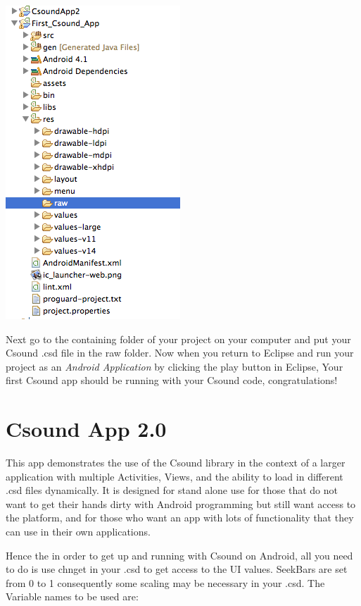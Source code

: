 \documentclass[11pt]{article}
\begin{document}
\begin{center}
\includegraphics[scale=0.60]{images/PackageExplorer}
\end{center}

Next go to the containing folder of your project on your computer and put your Csound .csd file in the raw folder. Now when you return to Eclipse and run your project as an \textit{Android Application} by clicking the play button in Eclipse, Your first Csound app should be running with your Csound code, congratulations!


\section{Csound App 2.0}
This app demonstrates the use of the Csound library in the context of a larger application with multiple Activities, Views, and the ability to load in different .csd files dynamically. It is designed for stand alone use for those that do not want to get their hands dirty with Android programming but still want access to the platform, and for those who want an app with lots of functionality that they can use in their own applications. 

Hence the in order to get up and running with Csound on Android, all you need to do is use chnget in your .csd to get access to the UI values. SeekBars are set from 0 to 1 consequently some scaling may be necessary in your .csd. The Variable names to be used are:
\end{document}
